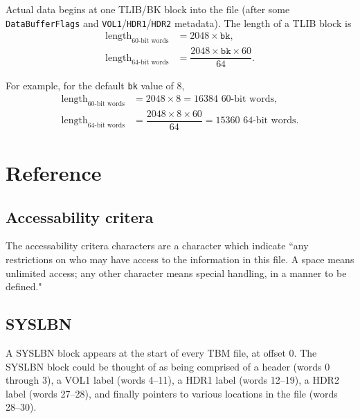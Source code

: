\documentclass{report}
\begin{document}
Actual data begins at one TLIB/BK block into the file (after some \texttt{DataBufferFlags} and \texttt{VOL1}/\texttt{HDR1}/\texttt{HDR2} metadata). The length of a TLIB block is
\begin{align*}
	\text{length}_\text{60-bit words} &= 2048 \times \texttt{bk} \mathrm{,} \\
	\text{length}_\text{64-bit words} &= \dfrac{2048 \times \texttt{bk} \times 60}{64} \mathrm{.}
\end{align*}

For example, for the default \texttt{bk} value of \(8\),
\begin{align*}
	\text{length}_\text{60-bit words} &= 2048 \times 8 = 16384 \text{ 60-bit words} \mathrm{,} \\
	\text{length}_\text{64-bit words} &= \dfrac{2048 \times 8 \times 60}{64} = 15360 \text{ 64-bit words} \mathrm{.}
\end{align*}

\chapter{Reference}

\section{Accessability critera} \label{Sec.AccessibilityCriteria}

The accessability critera characters are a character which indicate ``any restrictions on who may have access to the information in this file. A space means unlimited access; any other character means special handling, in a manner to be defined."


\section{SYSLBN}

A SYSLBN block appears at the start of every TBM file, at offset 0. The SYSLBN block could be thought of as being comprised of a header (words 0 through 3), a VOL1 label (words 4--11), a HDR1 label (words 12--19), a HDR2 label (words 27--28), and finally pointers to various locations in the file (words 28--30).
\end{document}
